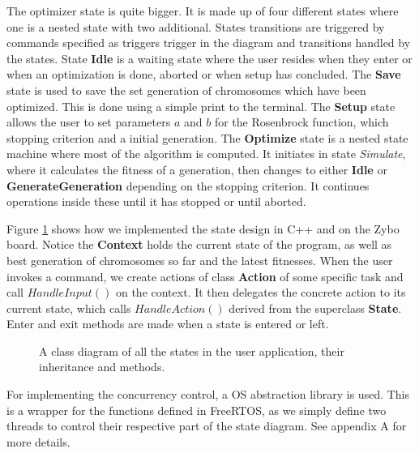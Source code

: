 The optimizer state is quite bigger. It is made up of four different states where one is a nested state with two additional.
States transitions are triggered by commands specified as triggers trigger in the diagram and transitions handled by the states. State \textbf{Idle} is a waiting state where the user resides when they enter or when an optimization is done, aborted or when setup has concluded. The \textbf{Save} state is used to save the set generation of chromosomes which have been optimized. This is done using a simple print to the terminal. The \textbf{Setup} state allows the user to set parameters $a$ and $b$ for the Rosenbrock function, which stopping criterion and a initial generation. The \textbf{Optimize} state is a nested state machine where most of the algorithm is computed. It initiates in state \emph{Simulate}, where it calculates the fitness of a generation, then changes to either \textbf{Idle} or \textbf{GenerateGeneration} depending on the stopping criterion. It continues operations inside these until it has stopped or until aborted.

Figure \ref{fig:classdiagram} shows how we implemented the state design in C++ and on the Zybo board. Notice the \textbf{Context} holds the current state of the program, as well as best generation of chromosomes so far and the latest fitnesses. When the user invokes a command, we create actions of class \textbf{Action} of some specific task and call $HandleInput()$ on the context. It then delegates the concrete action to its current state, which calls $HandleAction()$ derived from the superclass \textbf{State}. Enter and exit methods are made when a state is entered or left.

\begin{figure}[h!]
	\centering
	\caption{A class diagram of all the states in the user application, their inheritance and methods.}
	\label{fig:classdiagram}
\end{figure}

For implementing the concurrency control, a OS abstraction library is used. This is a wrapper for the functions defined in FreeRTOS, as we simply define two threads to control their respective part of the state diagram. See appendix A for more details.


